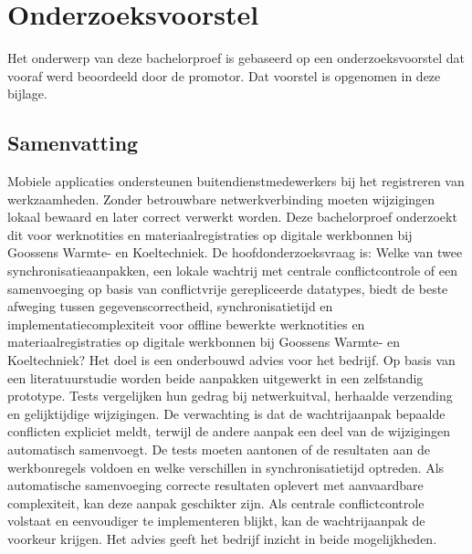 \documentclass[dutch,dit,thesis]{hogentreport}
\begin{document}





%
%




\appendix

\chapter{Onderzoeksvoorstel}

Het onderwerp van deze bachelorproef is gebaseerd op een onderzoeksvoorstel dat vooraf werd beoordeeld door de promotor. Dat voorstel is opgenomen in deze bijlage.

\section*{Samenvatting}
Mobiele applicaties ondersteunen buitendienstmedewerkers bij het registreren van werkzaamheden.
Zonder betrouwbare netwerkverbinding moeten wijzigingen lokaal bewaard en later correct verwerkt worden.
Deze bachelorproef onderzoekt dit voor werknotities en materiaalregistraties op digitale werkbonnen bij
Goossens Warmte- en Koeltechniek. De hoofdonderzoeksvraag is:
Welke van twee synchronisatieaanpakken, een lokale wachtrij met centrale conflictcontrole of een samenvoeging op basis van conflictvrije gerepliceerde datatypes,
biedt de beste afweging tussen gegevenscorrectheid, synchronisatietijd en implementatiecomplexiteit voor offline bewerkte
werknotities en materiaalregistraties op digitale werkbonnen bij Goossens Warmte- en Koeltechniek?
Het doel is een onderbouwd advies voor het bedrijf.
Op basis van een literatuurstudie worden beide aanpakken uitgewerkt in een zelfstandig prototype. Tests vergelijken hun
gedrag bij netwerkuitval, herhaalde verzending en gelijktijdige wijzigingen. De verwachting is dat de
wachtrijaanpak bepaalde conflicten expliciet meldt, terwijl de andere aanpak een deel van de wijzigingen
automatisch samenvoegt. De tests moeten aantonen of de resultaten aan de werkbonregels voldoen en welke
verschillen in synchronisatietijd optreden. Als automatische samenvoeging correcte resultaten oplevert
met aanvaardbare complexiteit, kan deze aanpak geschikter zijn. Als centrale conflictcontrole volstaat
en eenvoudiger te implementeren blijkt, kan de wachtrijaanpak de voorkeur krijgen. Het advies geeft het
bedrijf inzicht in beide mogelijkheden.
\end{document}
